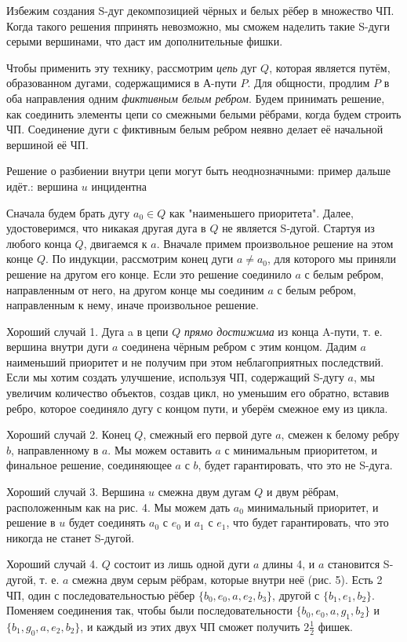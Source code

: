 \begin{proofstar}
Избежим создания S-дуг декомпозицией чёрных и белых рёбер в множество ЧП. Когда такого решения ппринять невозможно, мы сможем наделить такие S-дуги серыми вершинами, что даст им дополнительные фишки. 

Чтобы применить эту технику, рассмотрим \textit{цепь} дуг $Q$, которая является путём, образованном дугами, содержащимися в А-пути $P$. Для общности, продлим $P$ в оба направления одним \textit{фиктивным белым ребром}. Будем принимать решение, как соединить элементы цепи со смежными белыми рёбрами, когда будем строить ЧП. Соединение дуги с фиктивным белым ребром неявно делает её начальной вершиной её ЧП.

Решение о разбиении внутри цепи могут быть неоднозначными: пример дальше идёт.: вершина $u$ инцидентна 

Сначала будем брать дугу $a_0 \in Q$ как "наименьшего приоритета". Далее, удостоверимся, что никакая другая дуга в $Q$ не является S-дугой. Стартуя из любого конца $Q$, двигаемся к $a$. Вначале примем произвольное решение на этом конце $Q$. По индукции, рассмотрим конец дуги $a \ne a_0$, для которого мы приняли решение на другом его конце. Если это решение соединило $a$ с белым ребром, направленным от него, на другом конце мы соединим $a$ с белым ребром, направленным к нему, иначе произвольное решение.

Хороший случай 1.
Дуга a в цепи $Q$ \textit{прямо достижима} из конца A-пути, т. е. вершина внутри дуги $a$ соединена чёрным ребром с этим концом. Дадим $a$ наименьший приоритет и не получим при этом неблагоприятных последствий. Если мы хотим создать улучшение, используя ЧП, содержащий S-дугу $a$, мы увеличим количество объектов, создав цикл, но уменьшим его обратно, вставив ребро, которое соединяло дугу с концом пути, и уберём смежное ему из цикла.

Хороший случай 2.
Конец $Q$, смежный его первой дуге $a$, смежен к белому ребру $b$, направленному в $a$. Мы можем оставить $a$ с минимальным приоритетом, и финальное решение, соединяющее $a$ с $b$, будет гарантировать, что это не S-дуга.

Хороший случай 3. 
Вершина $u$ смежна двум дугам $Q$ и двум рёбрам, расположенным как на рис. 4. Мы можем дать $a_0$ минимальный приоритет, и решение в $u$ будет соединять $a_0$ с $e_0$ и $a_1$ с $e_1$, что будет гарантировать, что это никогда не станет S-дугой.

Хороший случай 4.
$Q$ состоит из лишь одной дуги $a$ длины 4, и $a$ становится S-дугой, т. е. $a$ смежна двум серым рёбрам, которые внутри неё (рис. 5). Есть 2 ЧП, один с последовательностью рёбер $\{b_0, e_0, a, e_2, b_3\}$, другой с $\{b_1, e_1, b_2\}$. Поменяем соединения так, чтобы были последовательности $\{b_0, e_0, a, g_1, b_2\}$ и $\{b_1, g_0, a, e_2, b_2\}$, и каждый из этих двух ЧП сможет получить $2\frac{1}{2}$ фишек.


\end{proofstar}
